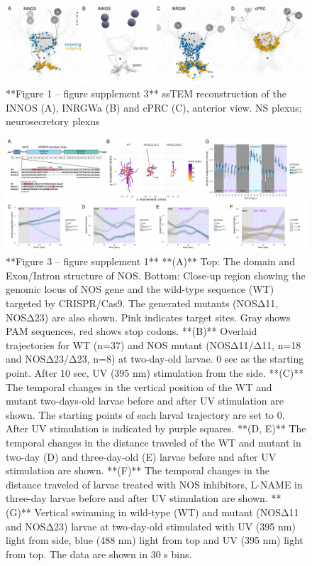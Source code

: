 \documentclass[
  10pt,
  onecolumn]{article}
\begin{document}
\begin{figure}
\includegraphics[width=43.06in]{figures/Fig1_sup3} \caption{**Figure 1 -- figure supplement 3** ssTEM reconstruction of the INNOS (A), INRGWa (B) and cPRC (C), anterior view. NS plexus; neurosecretory plexus}\label{fig:unnamed-chunk-10}
\end{figure}

\begin{figure}
\includegraphics[width=44.44in]{figures/Fig3_sup1} \caption{**Figure 3 -- figure supplement 1** **(A)** Top: The domain and Exon/Intron structure of NOS. Bottom: Close-up region showing the genomic locus of NOS gene and the wild-type sequence (WT) targeted by CRISPR/Cas9. The generated mutants (NOSΔ11, NOSΔ23) are also shown. Pink indicates target sites. Gray shows PAM sequences, red shows stop codons. **(B)** Overlaid trajectories for WT (n=37) and NOS mutant (NOSΔ11/Δ11, n=18 and NOSΔ23/Δ23, n=8) at two-day-old larvae. 0 sec as the starting point. After 10 sec, UV (395 nm) stimulation from the side. **(C)** The temporal changes in the vertical position of the WT and mutant two-days-old larvae before and after UV stimulation are shown. The starting points of each larval trajectory are set to 0. After UV stimulation is indicated by purple squares. **(D, E)** The temporal changes in the distance traveled of the WT and mutant in two-day (D) and three-day-old (E) larvae before and after UV stimulation are shown. **(F)** The temporal changes in the distance traveled of larvae treated with NOS inhibitors, L-NAME in three-day larvae before and after UV stimulation are shown. **(G)** Vertical swimming in wild-type (WT) and mutant (NOSΔ11 and NOSΔ23) larvae at two-day-old stimulated with UV (395 nm) light from side, blue (488 nm) light from top and UV (395 nm) light from top. The data are shown in 30 s bins.}\label{fig:unnamed-chunk-11}
\end{figure}
\end{document}
